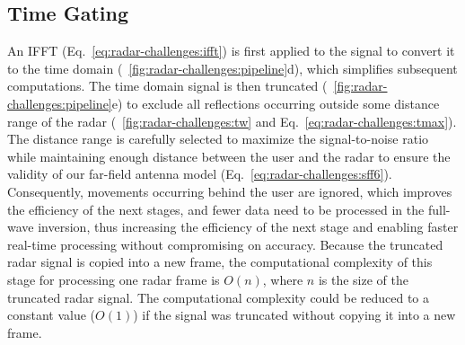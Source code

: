 

\subsection{Time Gating} \label{sec:radar-challenges:processing-strategy:time-gating}
An IFFT (Eq.~\ref{eq:radar-challenges:ifft}) is first applied to the signal to convert it to the time domain (\fig~\ref{fig:radar-challenges:pipeline}d), which simplifies subsequent computations.
The time domain signal is then truncated (\fig~\ref{fig:radar-challenges:pipeline}e) to exclude all reflections occurring outside some distance range of the radar (\fig~\ref{fig:radar-challenges:tw} and Eq.~\ref{eq:radar-challenges:tmax}). The distance range is carefully selected to maximize the signal-to-noise ratio while maintaining enough distance between the user and the radar to ensure the validity of our far-field antenna model (Eq.~\ref{eq:radar-challenges:sff6}). Consequently, movements occurring behind the user are ignored, which improves the efficiency of the next stages, and fewer data need to be processed in the full-wave inversion, thus increasing the efficiency of the next stage and enabling faster real-time processing without compromising on accuracy.
%
Because the truncated radar signal is copied into a new frame, the computational complexity of this stage for processing one radar frame is $O(n)$, where $n$ is the size of the truncated radar signal. The computational complexity could be reduced to a constant value ($O(1)$) if the signal was truncated without copying it into a new frame.


